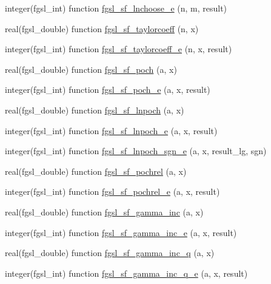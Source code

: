 \begin{DoxyCompactItemize}
\item 
integer(fgsl\-\_\-int) function \hyperlink{specfunc_8finc_a3e88f853a2bc050050fe4b95fcc934aa}{fgsl\-\_\-sf\-\_\-lnchoose\-\_\-e} (n, m, result)
\item 
real(fgsl\-\_\-double) function \hyperlink{specfunc_8finc_ada974ef72747d7801e2d156c9405e348}{fgsl\-\_\-sf\-\_\-taylorcoeff} (n, x)
\item 
integer(fgsl\-\_\-int) function \hyperlink{specfunc_8finc_a2a21bc0bca483d88ca6dbf497fad556e}{fgsl\-\_\-sf\-\_\-taylorcoeff\-\_\-e} (n, x, result)
\item 
real(fgsl\-\_\-double) function \hyperlink{specfunc_8finc_ad671fdb0ba4a2de7e928d1c0d9f817a3}{fgsl\-\_\-sf\-\_\-poch} (a, x)
\item 
integer(fgsl\-\_\-int) function \hyperlink{specfunc_8finc_a9c27185f9a79f0b502e4004eef77694f}{fgsl\-\_\-sf\-\_\-poch\-\_\-e} (a, x, result)
\item 
real(fgsl\-\_\-double) function \hyperlink{specfunc_8finc_ab4a6d83007f92e667128998936805deb}{fgsl\-\_\-sf\-\_\-lnpoch} (a, x)
\item 
integer(fgsl\-\_\-int) function \hyperlink{specfunc_8finc_afbc52045f5d774156b1059d51f83e1af}{fgsl\-\_\-sf\-\_\-lnpoch\-\_\-e} (a, x, result)
\item 
integer(fgsl\-\_\-int) function \hyperlink{specfunc_8finc_ab5b4bdeb8c0d3f934706161bb20443f5}{fgsl\-\_\-sf\-\_\-lnpoch\-\_\-sgn\-\_\-e} (a, x, result\-\_\-lg, sgn)
\item 
real(fgsl\-\_\-double) function \hyperlink{specfunc_8finc_a8a0327ea5087c41334d770c3c5b6436c}{fgsl\-\_\-sf\-\_\-pochrel} (a, x)
\item 
integer(fgsl\-\_\-int) function \hyperlink{specfunc_8finc_ad17f3c64c4a0b1929878d3ee767ad1d7}{fgsl\-\_\-sf\-\_\-pochrel\-\_\-e} (a, x, result)
\item 
real(fgsl\-\_\-double) function \hyperlink{specfunc_8finc_a4cc957b18f8e34d5708a9a6622076129}{fgsl\-\_\-sf\-\_\-gamma\-\_\-inc} (a, x)
\item 
integer(fgsl\-\_\-int) function \hyperlink{specfunc_8finc_a09464cf084f6cb6eb0b9431d4cb7755c}{fgsl\-\_\-sf\-\_\-gamma\-\_\-inc\-\_\-e} (a, x, result)
\item 
real(fgsl\-\_\-double) function \hyperlink{specfunc_8finc_a3094fbe23207acc003bcc48b10173e81}{fgsl\-\_\-sf\-\_\-gamma\-\_\-inc\-\_\-q} (a, x)
\item 
integer(fgsl\-\_\-int) function \hyperlink{specfunc_8finc_a56e429ccd4b6223adfde43c33d146249}{fgsl\-\_\-sf\-\_\-gamma\-\_\-inc\-\_\-q\-\_\-e} (a, x, result)

\end{DoxyCompactItemize}

